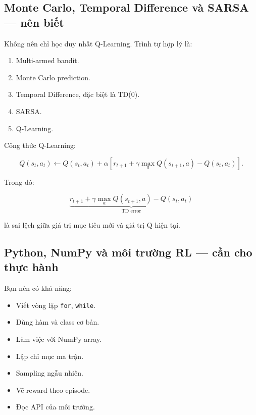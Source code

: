 \documentclass[12pt,a4paper]{article}
\begin{document}
\subsection{Monte Carlo, Temporal Difference và SARSA --- nên biết}

Không nên chỉ học duy nhất Q-Learning. Trình tự hợp lý là:

\begin{enumerate}[leftmargin=1.8em]
    \item Multi-armed bandit.
    \item Monte Carlo prediction.
    \item Temporal Difference, đặc biệt là TD(0).
    \item SARSA.
    \item Q-Learning.
\end{enumerate}

Công thức Q-Learning:

\begin{equation}
Q(s_t,a_t)
\leftarrow
Q(s_t,a_t)
+
\alpha
\left[
r_{t+1}
+
\gamma \max_a Q(s_{t+1},a)
-
Q(s_t,a_t)
\right].
\end{equation}

Trong đó:

\begin{equation}
\underbrace{
r_{t+1}
+
\gamma \max_a Q(s_{t+1},a)
-
Q(s_t,a_t)
}_{\text{TD error}}
\end{equation}

là sai lệch giữa giá trị mục tiêu mới và giá trị Q hiện tại.

\subsection{Python, NumPy và môi trường RL --- cần cho thực hành}

Bạn nên có khả năng:

\begin{itemize}[leftmargin=1.5em]
    \item Viết vòng lặp \texttt{for}, \texttt{while}.
    \item Dùng hàm và class cơ bản.
    \item Làm việc với NumPy array.
    \item Lập chỉ mục ma trận.
    \item Sampling ngẫu nhiên.
    \item Vẽ reward theo episode.
    \item Đọc API của môi trường.
\end{itemize}
\end{document}
